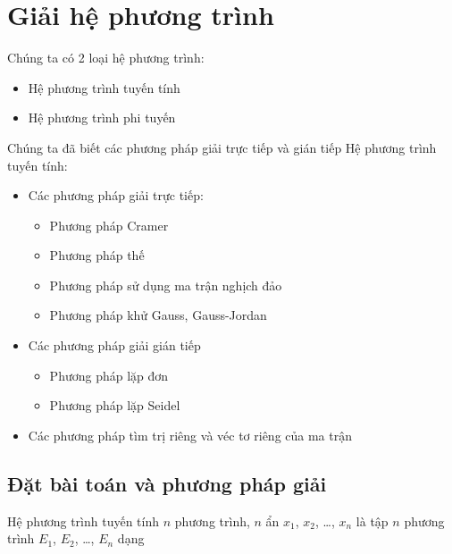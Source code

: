 \documentclass[../../Lectures]{subfiles}
\begin{document}
\chapter{Giải hệ phương trình}

Chúng ta có 2 loại hệ phương trình:

\begin{itemize}
    \item Hệ phương trình tuyến tính
    \item Hệ phương trình phi tuyến
\end{itemize}

Chúng ta đã biết các phương pháp giải trực tiếp và gián tiếp Hệ phương trình
tuyến tính:

\begin{itemize}
    \item Các phương pháp giải trực tiếp:

        \begin{itemize}
            \item Phương pháp Cramer
            \item Phương pháp thế
            \item Phương pháp sử dụng ma trận nghịch đảo
            \item Phương pháp khử Gauss, Gauss-Jordan
        \end{itemize}

    \item Các phương pháp giải gián tiếp

        \begin{itemize}
            \item Phương pháp lặp đơn
            \item Phương pháp lặp Seidel
        \end{itemize}

    \item Các phương pháp tìm trị riêng và véc tơ riêng của ma trận
\end{itemize}



\section{Đặt bài toán và phương pháp giải}

Hệ phương trình tuyến tính \(n\) phương trình, \(n\) ẩn \(x_1\), \(x_2\),
\ldots, \(x_n\) là tập \(n\) phương trình \(E_1\), \(E_2\), \ldots , \(E_n\)
dạng
\end{document}
